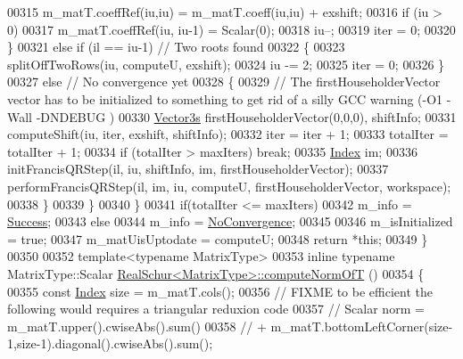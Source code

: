 \begin{DoxyCode}
00315         m\_matT.coeffRef(iu,iu) = m\_matT.coeff(iu,iu) + exshift;
00316         \textcolor{keywordflow}{if} (iu > 0)
00317           m\_matT.coeffRef(iu, iu-1) = Scalar(0);
00318         iu--;
00319         iter = 0;
00320       \}
00321       \textcolor{keywordflow}{else} \textcolor{keywordflow}{if} (il == iu-1) \textcolor{comment}{// Two roots found}
00322       \{
00323         splitOffTwoRows(iu, computeU, exshift);
00324         iu -= 2;
00325         iter = 0;
00326       \}
00327       \textcolor{keywordflow}{else} \textcolor{comment}{// No convergence yet}
00328       \{
00329         \textcolor{comment}{// The firstHouseholderVector vector has to be initialized to something to get rid of a silly GCC
       warning (-O1 -Wall -DNDEBUG )}
00330         \hyperlink{group___core___module}{Vector3s} firstHouseholderVector(0,0,0), shiftInfo;
00331         computeShift(iu, iter, exshift, shiftInfo);
00332         iter = iter + 1;
00333         totalIter = totalIter + 1;
00334         \textcolor{keywordflow}{if} (totalIter > maxIters) \textcolor{keywordflow}{break};
00335         \hyperlink{group___eigenvalues___module_a8bd4653e2d9569a44ecc95e746422d3f}{Index} im;
00336         initFrancisQRStep(il, iu, shiftInfo, im, firstHouseholderVector);
00337         performFrancisQRStep(il, im, iu, computeU, firstHouseholderVector, workspace);
00338       \}
00339     \}
00340   \}
00341   \textcolor{keywordflow}{if}(totalIter <= maxIters)
00342     m\_info = \hyperlink{group__enums_gga85fad7b87587764e5cf6b513a9e0ee5ea52581b035f4b59c203b8ff999ef5fcea}{Success};
00343   \textcolor{keywordflow}{else}
00344     m\_info = \hyperlink{group__enums_gga85fad7b87587764e5cf6b513a9e0ee5eaba1c8763d1179778070f365ecc4157a8}{NoConvergence};
00345 
00346   m\_isInitialized = \textcolor{keyword}{true};
00347   m\_matUisUptodate = computeU;
00348   \textcolor{keywordflow}{return} *\textcolor{keyword}{this};
00349 \}
00350 
00352 \textcolor{keyword}{template}<\textcolor{keyword}{typename} MatrixType>
00353 \textcolor{keyword}{inline} \textcolor{keyword}{typename} MatrixType::Scalar \hyperlink{group___eigenvalues___module_class_eigen_1_1_real_schur}{RealSchur<MatrixType>::computeNormOfT}
      ()
00354 \{
00355   \textcolor{keyword}{const} \hyperlink{group___eigenvalues___module_a8bd4653e2d9569a44ecc95e746422d3f}{Index} size = m\_matT.cols();
00356   \textcolor{comment}{// FIXME to be efficient the following would requires a triangular reduxion code}
00357   \textcolor{comment}{// Scalar norm = m\_matT.upper().cwiseAbs().sum() }
00358   \textcolor{comment}{//               + m\_matT.bottomLeftCorner(size-1,size-1).diagonal().cwiseAbs().sum();}

\end{DoxyCode}
